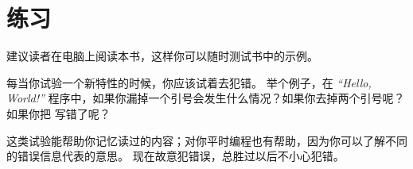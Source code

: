 \section{练习}

\begin{exercise}


建议读者在电脑上阅读本书，这样你可以随时测试书中的示例。


每当你试验一个新特性的时候，你应该试着去犯错。 举个例子，在 {\em “Hello, World!”} 程序中，如果你漏掉一个引号会发生什么情况？如果你去掉两个引号呢？如果你把 {\em {}} 写错了呢？
  


这类试验能帮助你记忆读过的内容；对你平时编程也有帮助，因为你可以了解不同的错误信息代表的意思。 现在故意犯错误，总胜过以后不小心犯错。



\end{exercise}
